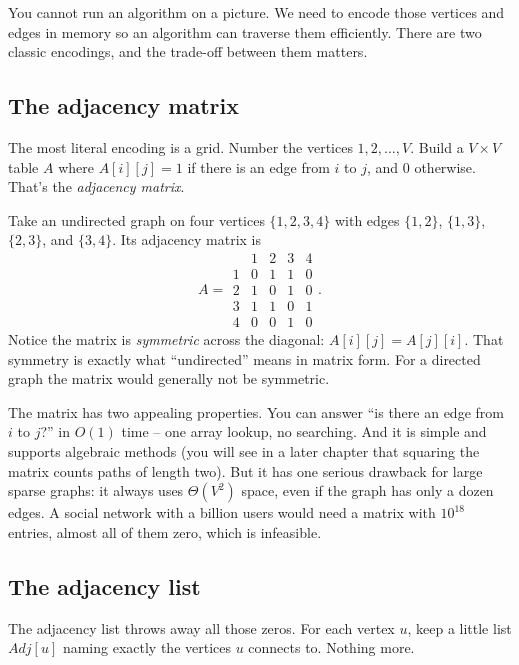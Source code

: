 You cannot run an algorithm on a picture. We need to encode those vertices and
edges in memory so an algorithm can traverse them efficiently. There are two
classic encodings, and the trade-off between them matters.

\subsection{The adjacency matrix}

The most literal encoding is a grid. Number the vertices $1, 2, \ldots, V$.
Build a $V \times V$ table $A$ where $A[i][j] = 1$ if there is an edge from $i$
to $j$, and $0$ otherwise. That's the \emph{adjacency matrix}.

\begin{example}
\label{ch22:matrix-example}
Take an undirected graph on four vertices $\{1, 2, 3, 4\}$ with edges
$\{1,2\}$, $\{1,3\}$, $\{2,3\}$, and $\{3,4\}$. Its adjacency matrix is
\[
A =
\begin{array}{c|cccc}
 & 1 & 2 & 3 & 4 \\ \hline
1 & 0 & 1 & 1 & 0 \\
2 & 1 & 0 & 1 & 0 \\
3 & 1 & 1 & 0 & 1 \\
4 & 0 & 0 & 1 & 0
\end{array}.
\]
Notice the matrix is \emph{symmetric} across the diagonal: $A[i][j] = A[j][i]$.
That symmetry is exactly what ``undirected'' means in matrix form. For a
directed graph the matrix would generally not be symmetric.
\end{example}

The matrix has two appealing properties. You can answer ``is there an edge
from $i$ to $j$?'' in $O(1)$ time -- one array lookup, no searching. And it
is simple and supports algebraic methods (you will see in a later
chapter that squaring the matrix counts paths of length two). But it has one
serious drawback for large sparse graphs: it always uses $\Theta(V^2)$ space, even if
the graph has only a dozen edges. A social network with a billion users would
need a matrix with $10^{18}$ entries, almost all of them zero, which is
infeasible.

\subsection{The adjacency list}

The adjacency list throws away all those zeros. For each vertex $u$, keep a
little list $\mathit{Adj}[u]$ naming exactly the vertices $u$ connects to.
Nothing more.

